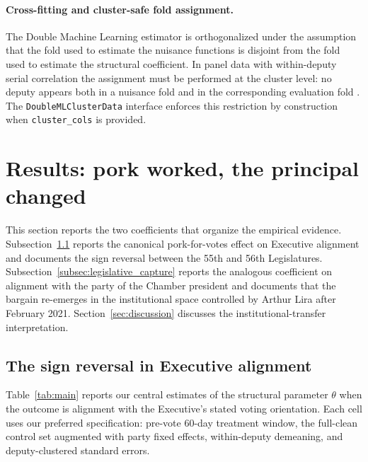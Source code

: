 \documentclass[preprint,12pt,authoryear]{elsarticle}
\begin{document}
\paragraph{Cross-fitting and cluster-safe fold assignment.} The Double Machine Learning estimator is orthogonalized under the assumption that the fold used to estimate the nuisance functions is disjoint from the fold used to estimate the structural coefficient. In panel data with within-deputy serial correlation the assignment must be performed at the cluster level: no deputy appears both in a nuisance fold and in the corresponding evaluation fold \citep{ChiangKatoMaSasaki2022}. The \texttt{DoubleMLClusterData} interface enforces this restriction by construction when \texttt{cluster\_cols} is provided.

\section{Results: pork worked, the principal changed}
\label{sec:results}

This section reports the two coefficients that organize the empirical evidence. Subsection~\ref{subsec:main_gov} reports the canonical pork-for-votes effect on Executive alignment and documents the sign reversal between the 55th and 56th Legislatures. Subsection~\ref{subsec:legislative_capture} reports the analogous coefficient on alignment with the party of the Chamber president and documents that the bargain re-emerges in the institutional space controlled by Arthur Lira after February 2021. Section~\ref{sec:discussion} discusses the institutional-transfer interpretation.

\subsection{The sign reversal in Executive alignment}
\label{subsec:main_gov}

Table~\ref{tab:main} reports our central estimates of the structural parameter $\theta$ when the outcome is alignment with the Executive's stated voting orientation. Each cell uses our preferred specification: pre-vote 60-day treatment window, the full-clean control set augmented with party fixed effects, within-deputy demeaning, and deputy-clustered standard errors.
\end{document}
